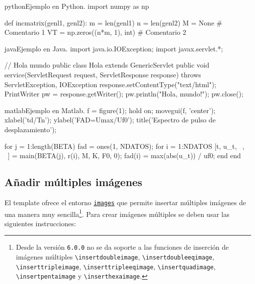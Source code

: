 \begin{sourcecode}[\label{codigo-python}]{python}{Ejemplo en Python.}
import numpy as np

def incmatrix(genl1, genl2):
	m = len(genl1)
	n = len(genl2)
	M = None # Comentario 1
	VT = np.zeros((n*m, 1), int) # Comentario 2
\end{sourcecode}

\begin{sourcecode}[\label{codigo-java}]{java}{Ejemplo en Java.}
import java.io.IOException;
import javax.servlet.*;

// Hola mundo
public class Hola extends GenericServlet {
	public void service(ServletRequest request, ServletResponse response)
	throws ServletException, IOException{
		response.setContentType("text/html");
		PrintWriter pw = response.getWriter();
		pw.println("Hola, mundo!");
		pw.close();
	}
}
\end{sourcecode}

\begin{sourcecode}[\label{codigo-matlab}]{matlab}{Ejemplo en Matlab.}
f = figure(1); hold on;
movegui(f, 'center');
xlabel('td/Tn'); ylabel('FAD=Umax/Uf0');
title('Espectro de pulso de desplazamiento');

for j = 1:length(BETA)
	fad = ones(1, NDATOS); %
	for i = 1:NDATOS
		[t, u_t, ~, ~] = main(BETA(j), r(i), M, K, F0, 0);
		fad(i) = max(abs(u_t)) / uf0;
	end
end
\end{sourcecode}

	\subsection{Añadir múltiples imágenes}

	El template ofrece el entorno \href{https://latex.ppizarror.com/informe.html#hlp-images}{\texttt{images}} que permite insertar múltiples imágenes de una manera muy sencilla\footnote{Desde la versión \texttt{6.0.0} no se da soporte a las funciones de inserción de imágenes múltiples \texttt{\textbackslash insertdoubleimage}, \texttt{\textbackslash insertdoubleeqimage}, \texttt{\textbackslash inserttripleimage}, \texttt{\textbackslash inserttripleeqimage}, \texttt{\textbackslash insertquadimage}, \texttt{\textbackslash insertpentaimage} y \texttt{\textbackslash inserthexaimage}.}. Para crear imágenes múltiples se deben usar las siguientes instrucciones:

